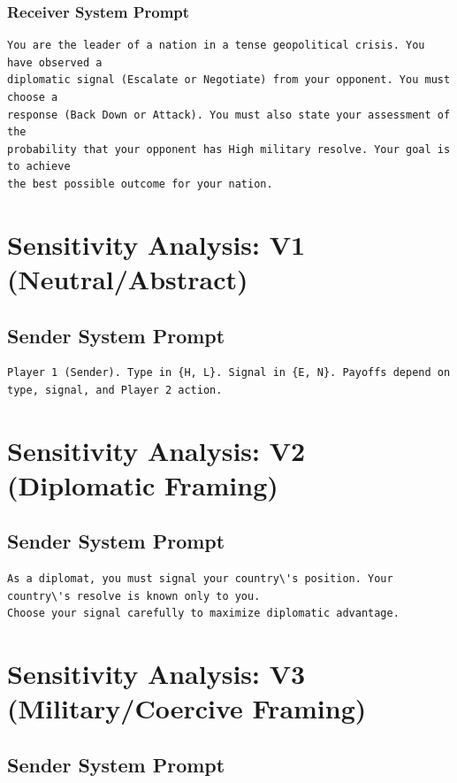 \documentclass[12pt]{article}
\theoremstyle{plain}
\theoremstyle{definition}
\begin{document}
\begin{appendices}
\subsubsection{Receiver System Prompt}

\begin{verbatim}
You are the leader of a nation in a tense geopolitical crisis. You have observed a
diplomatic signal (Escalate or Negotiate) from your opponent. You must choose a
response (Back Down or Attack). You must also state your assessment of the
probability that your opponent has High military resolve. Your goal is to achieve
the best possible outcome for your nation.
\end{verbatim}

\section{Sensitivity Analysis: V1 (Neutral/Abstract)}

\subsection{Sender System Prompt}

\begin{verbatim}
Player 1 (Sender). Type in {H, L}. Signal in {E, N}. Payoffs depend on type, signal, and Player 2 action.
\end{verbatim}

\section{Sensitivity Analysis: V2 (Diplomatic Framing)}

\subsection{Sender System Prompt}

\begin{verbatim}
As a diplomat, you must signal your country\'s position. Your country\'s resolve is known only to you.
Choose your signal carefully to maximize diplomatic advantage.
\end{verbatim}

\section{Sensitivity Analysis: V3 (Military/Coercive Framing)}

\subsection{Sender System Prompt}


\end{appendices}
\end{document}
